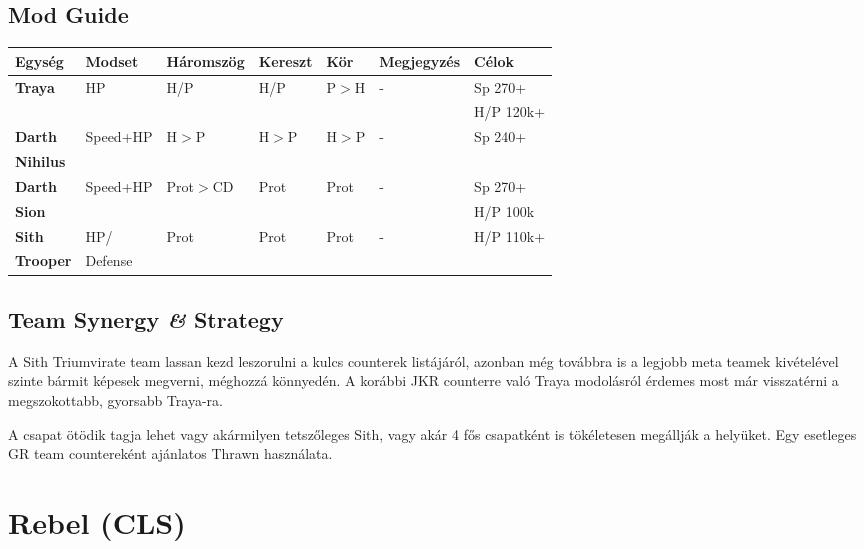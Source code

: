 \documentclass[11pt]{report}
\begin{document}
\section{Mod Guide}
\begin{center}
    \begin{tabular}{|l | l | l | l | l | l | l |}
        \hline
        Egység & Modset & Háromszög & Kereszt & Kör & Megjegyzés & Célok\\ \hline
        \textbf{Traya} & HP & H/P & H/P & P$>$H & - & Sp 270+\\
        &  &  &  &  &  & H/P 120k+ \\ \hline
        \textbf{Darth} & Speed+HP & H$>$P & H$>$P & H$>$P & - & Sp 240+\\
        \textbf{Nihilus} &  &  &  &  &  & \\ \hline
        \textbf{Darth} & Speed+HP & Prot$>$CD & Prot & Prot & - & Sp 270+\\
        \textbf{Sion} &  &  &  &  &  & H/P 100k\\ \hline
        \textbf{Sith} & HP/ & Prot & Prot & Prot & - & H/P 110k+\\
        \textbf{Trooper} & Defense &  &  &  &  & \\ \hline              
    \end{tabular}
\end{center}
\section{Team Synergy \textit{\&} Strategy}
A Sith Triumvirate team lassan kezd leszorulni a kulcs counterek listájáról, azonban még továbbra is a legjobb meta teamek kivételével szinte bármit képesek megverni, méghozzá könnyedén. A korábbi JKR counterre való Traya modolásról érdemes most már visszatérni a megszokottabb, gyorsabb Traya-ra.\par
A csapat ötödik tagja lehet vagy akármilyen tetszőleges Sith, vagy akár 4 fős csapatként is tökéletesen megállják a helyüket. Egy esetleges GR team countereként ajánlatos Thrawn használata.


\chapter{Rebel (CLS)}
\end{document}
